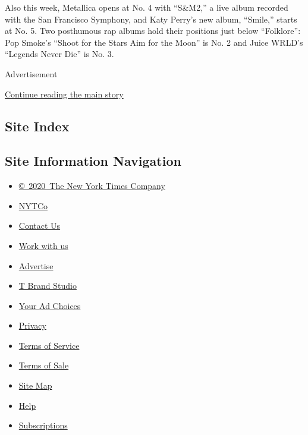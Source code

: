 Also this week, Metallica opens at No. 4 with ``S\&M2,'' a live album
recorded with the San Francisco Symphony, and Katy Perry's new album,
``Smile,'' starts at No. 5. Two posthumous rap albums hold their
positions just below ``Folklore'': Pop Smoke's ``Shoot for the Stars Aim
for the Moon'' is No. 2 and Juice WRLD's ``Legends Never Die'' is No. 3.

Advertisement

\protect\hyperlink{after-bottom}{Continue reading the main story}

\hypertarget{site-index}{%
\subsection{Site Index}\label{site-index}}

\hypertarget{site-information-navigation}{%
\subsection{Site Information
Navigation}\label{site-information-navigation}}

\begin{itemize}
\tightlist
\item
  \href{https://help.nytimes3xbfgragh.onion/hc/en-us/articles/115014792127-Copyright-notice}{©~2020~The
  New York Times Company}
\end{itemize}

\begin{itemize}
\tightlist
\item
  \href{https://www.nytco.com/}{NYTCo}
\item
  \href{https://help.nytimes3xbfgragh.onion/hc/en-us/articles/115015385887-Contact-Us}{Contact
  Us}
\item
  \href{https://www.nytco.com/careers/}{Work with us}
\item
  \href{https://nytmediakit.com/}{Advertise}
\item
  \href{http://www.tbrandstudio.com/}{T Brand Studio}
\item
  \href{https://www.nytimes3xbfgragh.onion/privacy/cookie-policy\#how-do-i-manage-trackers}{Your
  Ad Choices}
\item
  \href{https://www.nytimes3xbfgragh.onion/privacy}{Privacy}
\item
  \href{https://help.nytimes3xbfgragh.onion/hc/en-us/articles/115014893428-Terms-of-service}{Terms
  of Service}
\item
  \href{https://help.nytimes3xbfgragh.onion/hc/en-us/articles/115014893968-Terms-of-sale}{Terms
  of Sale}
\item
  \href{https://spiderbites.nytimes3xbfgragh.onion}{Site Map}
\item
  \href{https://help.nytimes3xbfgragh.onion/hc/en-us}{Help}
\item
  \href{https://www.nytimes3xbfgragh.onion/subscription?campaignId=37WXW}{Subscriptions}
\end{itemize}
